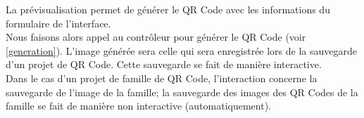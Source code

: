 \par
La prévisualisation permet de générer le QR Code avec les informations du formulaire de l'interface.\\
Nous faisons alors appel au contrôleur pour générer le QR Code (voir \ref{generation}).
L'image générée sera celle qui sera enregistrée lors de la sauvegarde d'un projet de QR Code. Cette sauvegarde se fait de manière interactive.\\
Dans le cas d'un projet de famille de QR Code, l'interaction concerne la sauvegarde de l'image de la famille; la sauvegarde des images des QR Codes de la famille se fait de manière non interactive (automatiquement).
